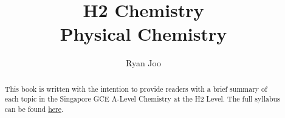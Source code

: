 \documentclass[12pt,a4 paper]{article}
\begin{document}
\title{\textbf{H2 Chemistry\\ Physical Chemistry}}
\author{Ryan Joo}

\maketitle

\begin{abstract}
This book is written with the intention to provide readers with a brief summary of each topic in the Singapore GCE A-Level Chemistry at the H2 Level. The full syllabus can be found \href{https://www.seab.gov.sg/docs/default-source/national-examinations/syllabus/alevel/2024syllabus/9729_y24_sy.pdf}{here}.
\end{abstract}
\pagebreak

\tableofcontents
\pagebreak









\end{document}
